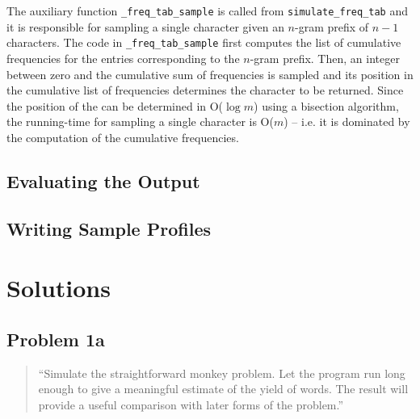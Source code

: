 \documentclass[conference]{IEEEtran}
\newcommand{\codeinline}[1]{{\fontsize{8}{0}\selectfont\texttt{#1}}}
\begin{document}
The auxiliary function \codeinline{\_freq\_tab\_sample} is called from \codeinline{simulate\_freq\_tab} and it is responsible for sampling a single character given an $n$-gram prefix of $n-1$ characters.
The code in \codeinline{\_freq\_tab\_sample} first computes the list of cumulative frequencies for the entries corresponding to the $n$-gram prefix.
Then, an integer between zero and the cumulative sum of frequencies is sampled and its position in the cumulative list of frequencies determines the character to be returned.
Since the position of the can be determined in O($\log m$) using a bisection algorithm, the running-time for sampling a single character is O($m$) 
-- i.e. it is dominated by the computation of the cumulative frequencies.


\subsection{Evaluating the Output}


\subsection{Writing Sample Profiles}




\section{Solutions\label{sec:solutions}}



\subsection{Problem 1a}
\label{sec:problem1}

\begin{quote}
``Simulate the straightforward monkey problem. Let the program run long enough to 
give a meaningful estimate of the yield of words. The result will provide a 
useful comparison with later forms of the problem.''
\end{quote}
\end{document}
